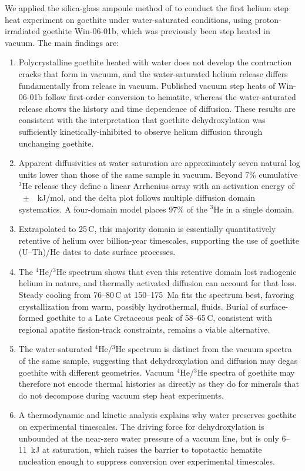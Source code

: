 We applied the silica-glass ampoule method of \citet{thyer2026method} to conduct the first
helium step heat experiment on goethite under water-saturated conditions, using
proton-irradiated goethite Win-06-01b, which was previously been step heated in vacuum. The main
findings are:
\begin{enumerate}
  \item Polycrystalline goethite heated with water does not develop the contraction cracks that
  form in vacuum, and the water-saturated helium release differs fundamentally from release in
  vacuum. Published vacuum step heats of Win-06-01b follow first-order conversion to hematite,
  whereas the water-saturated release shows the history and time dependence of diffusion. These
  results are consistent with the interpretation that goethite dehydroxylation was sufficiently kinetically-inhibited 
  to observe helium diffusion through unchanging goethite.
  \item Apparent diffusivities at water saturation are approximately seven natural log units
  lower than those of the same sample in vacuum. Beyond 7\% cumulative $^3$He release they define
  a linear Arrhenius array with an activation energy of \ChTwoEa{}~$\pm$~\ChTwoEaErr{}~kJ/mol, and
  the delta plot follows multiple diffusion domain systematics. A four-domain model places 97\% of
  the $^3$He in a single domain.
  \item Extrapolated to 25\,\textdegree C, this majority domain is essentially quantitatively retentive of
  helium over billion-year timescales, supporting the use of goethite (U--Th)/He dates to date
  surface processes.
  \item The $^4$He/$^3$He spectrum shows that even this retentive domain lost radiogenic helium in
  nature, and thermally activated diffusion can account for that
  loss. Steady cooling from 76--80\,\textdegree C at 150--175~Ma fits the spectrum best, favoring
  crystallization from warm, possibly hydrothermal, fluids. Burial of surface-formed goethite to a
  Late Cretaceous peak of 58--65\,\textdegree C, consistent with regional apatite fission-track
  constraints, remains a viable alternative.
  \item The water-saturated $^4$He/$^3$He spectrum is distinct from the vacuum spectra of
  the same sample, suggesting that dehydroxylation and diffusion may degas goethite with different
  geometries. Vacuum $^4$He/$^3$He spectra of goethite may therefore not encode thermal histories as
  directly as they do for minerals that do not decompose during vacuum step heat experiments.
  \item A thermodynamic and kinetic analysis explains why water preserves goethite on experimental
  timescales. The driving force for dehydroxylation is unbounded at the near-zero water pressure of a vacuum line, but is only
  6--11~kJ at saturation, which raises the barrier to topotactic hematite nucleation enough to suppress conversion over
  experimental timescales.
\end{enumerate}

